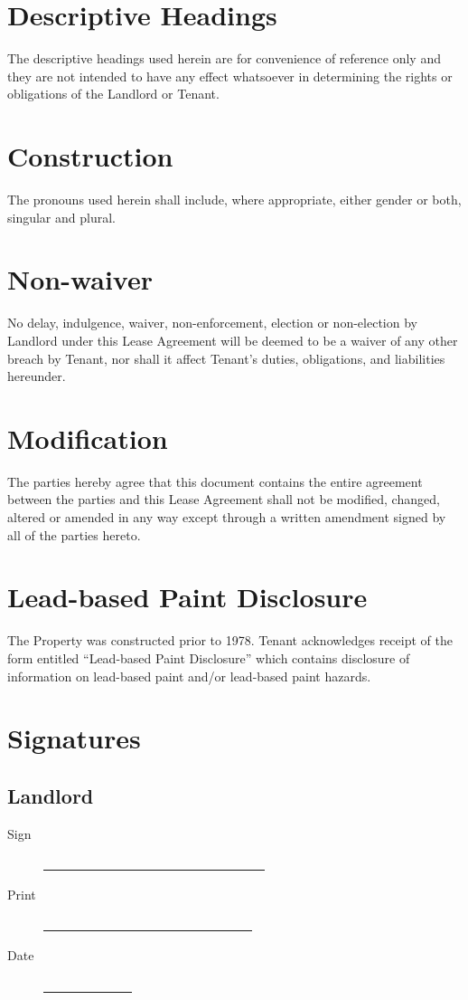\documentclass{amsart}
\begin{document}
\section{Descriptive Headings}
The descriptive headings used herein are for convenience of reference only and
they are not intended to have any effect whatsoever in determining the rights or
obligations of the Landlord or Tenant.
\section{Construction}
The pronouns used herein shall include, where appropriate, either gender or
both, singular and plural.
\section{Non-waiver}
No delay, indulgence, waiver, non-enforcement, election or non-election by
Landlord under this  Lease Agreement will be deemed to be a waiver of any other
breach by Tenant, nor shall it affect Tenant's duties, obligations, and
liabilities hereunder.
\section{Modification}
The parties hereby agree that this document contains the entire agreement
between the parties and this  Lease Agreement shall not be modified, changed,
altered or amended in any way except through a written amendment signed by all
of the parties hereto.
\section{Lead-based Paint Disclosure}
The Property was constructed prior to 1978. Tenant acknowledges receipt of the
form entitled ``Lead-based Paint Disclosure'' which contains disclosure of
information on lead-based paint and/or lead-based paint hazards.
\newpage
\section*{Signatures}
\subsection*{Landlord}
\begin{description}
    \item[Sign]
        \underline{\ \ \ \ \ \ \ \ \ \ \ \ \ \ \ \ \ \ \ \ \ \ \ \ \ \ \ \ \ \ \ \ \ \ \ }
    \item[Print]
        \underline{\ \ \ \ \ \ \ \ \ \ \ \ \ \ \ \ \ \ \ \ \ \ \ \ \ \ \ \ \ \ \ \ \ }
    \item[Date]
        \underline{\ \ \ \ \ \ \ \ \ \ \ \ \ \ }
\end{description}
\end{document}
